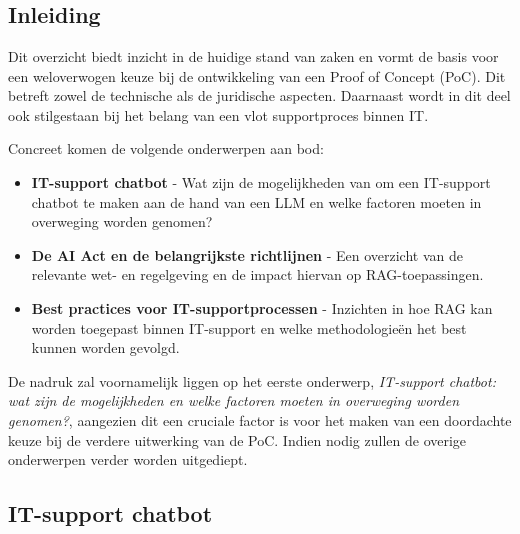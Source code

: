 \chapter{}
\label{ch:stand-van-zaken}



\section{Inleiding}
Dit overzicht biedt inzicht in de huidige stand van zaken en vormt de basis voor een weloverwogen keuze bij de ontwikkeling van een Proof of Concept (PoC). Dit betreft zowel de technische als de juridische aspecten. Daarnaast wordt in dit deel ook stilgestaan bij het belang van een vlot supportproces binnen IT.

Concreet komen de volgende onderwerpen aan bod:
\begin{itemize}
    \item \textbf{IT-support chatbot} - Wat zijn de mogelijkheden van om een IT-support chatbot te maken aan de hand van een LLM en welke factoren moeten in overweging worden genomen?
    \item \textbf{De AI Act en de belangrijkste richtlijnen} - Een overzicht van de relevante wet- en regelgeving en de impact hiervan op RAG-toepassingen.
    \item \textbf{Best practices voor IT-supportprocessen} - Inzichten in hoe RAG kan worden toegepast binnen IT-support en welke methodologieën het best kunnen worden gevolgd.
\end{itemize}

De nadruk zal voornamelijk liggen op het eerste onderwerp, \textit{IT-support chatbot: wat zijn de mogelijkheden en welke factoren moeten in overweging worden genomen?}, aangezien dit een cruciale factor is voor het maken van een doordachte keuze bij de verdere uitwerking van de PoC. Indien nodig zullen de overige onderwerpen verder worden uitgediept.

\section{IT-support chatbot}

